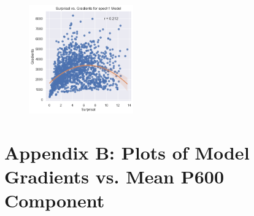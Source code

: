 \documentclass{IEEEtran}
\begin{document}
\begin{figure}[h]
    \centering
    \includegraphics[width=0.4\textwidth]{surprisal_vs_gradients/epoch1.png}
\end{figure}

\clearpage

\section*{Appendix B: Plots of Model Gradients vs. Mean P600 Component}
\end{document}

